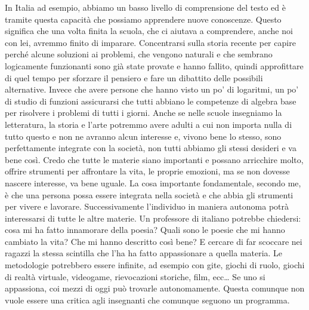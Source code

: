 \documentclass[12pt]{book} %
\begin{document}
In Italia ad esempio, abbiamo un basso livello di comprensione del testo ed è tramite questa capacità che possiamo
apprendere nuove conoscenze. Questo significa che una volta finita la scuola, che ci aiutava a comprendere, anche noi con lei,
avremmo finito di imparare. 
Concentrarsi sulla storia recente per capire perché alcune soluzioni ai
problemi, che vengono naturali e che sembrano logicamente funzionanti sono già state provate e hanno fallito, quindi
approfittare di quel tempo per sforzare il pensiero e fare un dibattito delle possibili alternative. Invece che avere
persone che hanno visto un po' di logaritmi, un po' di studio di funzioni assicurarsi che tutti
abbiano le competenze di algebra base per risolvere i problemi di tutti i giorni. 
Anche se nelle scuole
insegniamo la letteratura, la storia e l'arte potremmo avere adulti a cui non importa nulla di tutto
questo e non ne avranno alcun interesse e, vivono bene lo stesso, sono perfettamente integrate con la società, non
tutti abbiamo gli stessi desideri e va bene così. 
Credo che tutte le materie siano importanti e possano arricchire molto, offrire
strumenti per affrontare la vita, le proprie emozioni, ma se non dovesse nascere interesse, va bene uguale. 
La cosa importante fondamentale, secondo me, è che una persona possa essere integrata nella società e che abbia gli strumenti per vivere e
lavorare. Successivamente l'individuo in maniera autonoma potrà interessarsi di tutte le altre
materie.
Un professore di italiano potrebbe chiedersi: cosa mi ha fatto innamorare della poesia? Quali sono le poesie che mi hanno cambiato la vita? 
Che mi hanno descritto così bene? E cercare di far scoccare nei
ragazzi la stessa scintilla che l'ha ha fatto appassionare a quella materia. 
Le metodologie potrebbero essere infinite, ad esempio con gite, giochi di ruolo, giochi di realtà virtuale,
videogame, rievocazioni storiche, film, ecc… Se uno si appassiona, coi mezzi di oggi può
trovarle autonomamente. Questa comunque non vuole essere una critica agli insegnanti che comunque seguono un programma.
\end{document}
